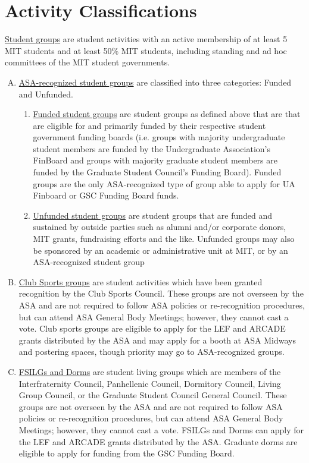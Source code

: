 \documentclass[12pt]{article}
\def\ul{\underline}
\begin{document}
\section{Activity Classifications}
\ul{Student groups} are student activities with an active membership of at least 5 MIT students and at
least 50\% MIT students, including standing and ad hoc committees of the MIT student governments.
\begin{enumerate}[A.]
    \item \ul{ASA-recognized student groups} are classified into three categories: Funded and Unfunded.
    \begin{enumerate}[noitemsep, label=\arabic*.]
        \item \ul{Funded student groups} are student groups as defined above that are that are eligible
for and primarily funded by their respective student government funding boards (i.e.
groups with majority undergraduate student members are funded by the
Undergraduate Association’s FinBoard and groups with majority graduate student
members are funded by the Graduate Student Council’s Funding Board). Funded
groups are the only ASA-recognized type of group able to apply for UA Finboard or
GSC Funding Board funds.

        \item \ul{Unfunded student groups} are student groups that are funded and sustained by
outside parties such as alumni and/or corporate donors, MIT grants, fundraising
efforts and the like. Unfunded groups may also be sponsored by an academic or
administrative unit at MIT, or by an ASA-recognized student group
    \end{enumerate}

    \item \ul{Club Sports groups} are student activities which have been granted recognition by the Club Sports
Council. These groups are not overseen by the ASA and are not required to follow ASA policies or
re-recognition procedures, but can attend ASA General Body Meetings; however, they cannot cast a
vote. Club sports groups are eligible to apply for the LEF and ARCADE grants distributed by the ASA and
may apply for a booth at ASA Midways and postering spaces, though priority may go to ASA-recognized
groups.

    \item  \ul{FSILGs and Dorms} are student living groups which are members of the Interfraternity Council,
Panhellenic Council, Dormitory Council, Living Group Council, or the Graduate Student Council General
Council. These groups are not overseen by the ASA and are not required to follow ASA policies or
re-recognition procedures, but can attend ASA General Body Meetings; however, they cannot cast a
vote. FSILGs and Dorms can apply for the LEF and ARCADE grants distributed by the ASA. Graduate
dorms are eligible to apply for funding from the GSC Funding Board.
\end{enumerate}
\end{document}
